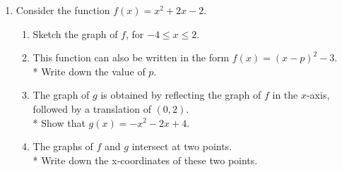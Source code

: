 \documentclass[12pt, twoside]{article}
\begin{document}
\begin{enumerate}
\newpage
\item Consider the function $f(x)=x^2+2x-2$.
\begin{enumerate}
    \item Sketch the graph of $f$, for $-4 \leq x \leq 2$.
    \item This function can also be written in the form $f(x)=(x-p)^2 -3$.\\*
    Write down the value of $p$.
    \item The graph of $g$ is obtained by reflecting the graph of $f$ in the $x$-axis, followed by a translation of $(0, 2)$.\\* Show that $g(x)=-x^2-2x+4$.
    \item The graphs of $f$ and $g$ intersect at two points.\\*
    Write down the x-coordinates of these two points.
\end{enumerate}

\begin{figure}[!htbp]
\begin{center}
\end{center}
\end{figure}


\end{enumerate}
\end{document}
